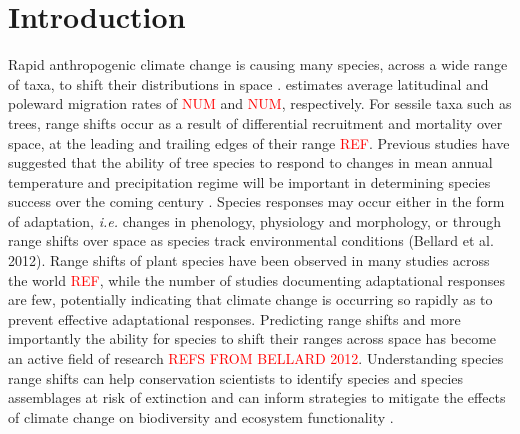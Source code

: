 \documentclass[a4paper,11pt]{article}
\newcommand{\todo}[1]{\textcolor{red}{#1}}   %
\begin{document}
\section{Introduction}
Rapid anthropogenic climate change is causing many species, across a wide range of taxa, to shift their distributions in space \citep{Hughes2000, Parmesan2006, Chen2011}. \citet{Chen2011} estimates average latitudinal and poleward migration rates of \todo{NUM} and \todo{NUM}, respectively. For sessile taxa such as trees, range shifts occur as a result of differential recruitment and mortality over space, at the leading and trailing edges of their range \todo{REF}. Previous studies have suggested that the ability of tree species to respond to changes in mean annual temperature and precipitation regime will be important in determining species success over the coming century \citep{Colwell2008, Chen2011, Feeley2012}. Species responses may occur either in the form of adaptation, \textit{i.e.} changes in phenology, physiology and morphology, or through range shifts over space as species track environmental conditions (Bellard et al. 2012). Range shifts of plant species have been observed in many studies across the world \todo{REF}, while the number of studies documenting adaptational responses are few, potentially indicating that climate change is occurring so rapidly as to prevent effective adaptational responses. Predicting range shifts and more importantly the ability for species to shift their ranges across space has become an active field of research \todo{REFS FROM BELLARD 2012}. Understanding species range shifts can help conservation scientists to identify species and species assemblages at risk of extinction and can inform strategies to mitigate the effects of climate change on biodiversity and ecosystem functionality \citep{REF}.
\end{document}
